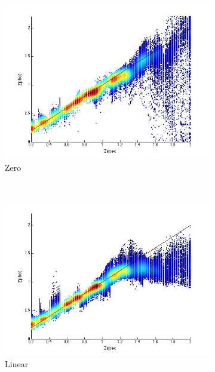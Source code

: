 \documentclass[useAMS,usenatbib,fleqn]{mn2e}
\begin{document}
\begin{figure}
       \begin{subfigure}[b]{0.24\textwidth}
                \includegraphics[width=\textwidth]{figures/22_0}
                \caption{Zero}
        \end{subfigure}
        ~
        \begin{subfigure}[b]{0.24\textwidth}
                \includegraphics[width=\textwidth]{figures/22_L}
                \caption{Linear}
        \end{subfigure}
        ~
        \begin{subfigure}[b]{0.24\textwidth}

\end{subfigure}
\end{figure}
\end{document}

